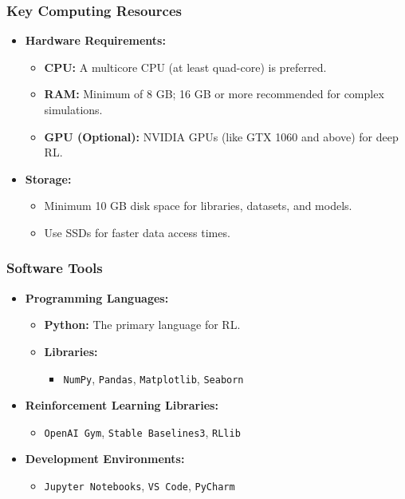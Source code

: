 \documentclass[aspectratio=169]{beamer}
\begin{document}
\begin{frame}
    \frametitle{Key Computing Resources}
    \begin{itemize}
        \item \textbf{Hardware Requirements:}
            \begin{itemize}
                \item \textbf{CPU:} A multicore CPU (at least quad-core) is preferred.
                \item \textbf{RAM:} Minimum of 8 GB; 16 GB or more recommended for complex simulations.
                \item \textbf{GPU (Optional):} NVIDIA GPUs (like GTX 1060 and above) for deep RL.
            \end{itemize}
        \item \textbf{Storage:}
            \begin{itemize}
                \item Minimum 10 GB disk space for libraries, datasets, and models.
                \item Use SSDs for faster data access times.
            \end{itemize}
    \end{itemize}
\end{frame}

\begin{frame}[fragile]
    \frametitle{Software Tools}
    \begin{itemize}
        \item \textbf{Programming Languages:}
            \begin{itemize}
                \item \textbf{Python:} The primary language for RL.
                \item \textbf{Libraries:}
                    \begin{itemize}
                        \item \texttt{NumPy}, \texttt{Pandas}, \texttt{Matplotlib}, \texttt{Seaborn}
                    \end{itemize}
            \end{itemize}
        \item \textbf{Reinforcement Learning Libraries:}
            \begin{itemize}
                \item \texttt{OpenAI Gym}, \texttt{Stable Baselines3}, \texttt{RLlib}
            \end{itemize}
        \item \textbf{Development Environments:}
            \begin{itemize}
                \item \texttt{Jupyter Notebooks}, \texttt{VS Code}, \texttt{PyCharm}
            \end{itemize}
    \end{itemize}
\end{frame}
\end{document}
